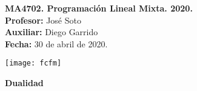 \documentclass[10pt]{article}
\theoremstyle{plain}
\theoremstyle{definition}
\newcommand{\sca}{Diego Garrido}
\newcommand{\fecha}{30 de  abril  de 2020}
\begin{document}
\vspace*{-1.2 cm}
\begin{minipage}{0.6\textwidth}
\begin{flushleft}
\hspace*{-0.5cm}\textbf{MA4702. Programación Lineal Mixta. 2020.}\\
\hspace*{-0.5cm}\textbf{Profesor:} José Soto\\
\hspace*{-0.5cm}\textbf{Auxiliar:} \sca\\
\hspace*{-0.5cm}\textbf{Fecha:} \fecha.
\end{flushleft}
\end{minipage}
\begin{minipage}{0.36\textwidth}
\begin{flushright}
\texttt{[image: fcfm]}
\end{flushright}
\end{minipage}
\bigskip

\begin{center}
\LARGE\textbf{Dualidad}
\end{center}
\end{document}
